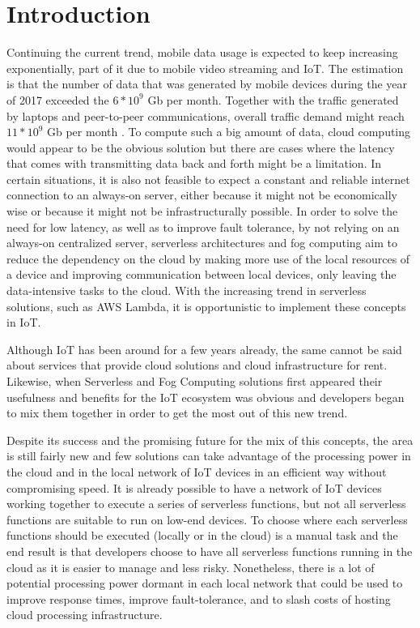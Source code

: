 \section{Introduction}
Continuing the current trend, mobile data usage is expected to keep increasing
exponentially, part of it due to mobile video streaming and
IoT. The estimation is that the number of data that was generated
by mobile devices during the year of 2017 exceeded the $\displaystyle 6 * 10^9$ Gb
per month. Together with the traffic generated by laptops and peer-to-peer
communications, overall traffic demand might reach $\displaystyle 11 * 10^9$ Gb per
month\cite{kn:Dehos2014} \cite{kn:Baresi2017}. To compute such a big amount of
data, cloud computing would appear to be the obvious solution but there are cases
where the latency that comes with transmitting data back and forth might be
a limitation. In certain situations, it is also not feasible to expect a constant and
reliable internet connection to an always-on server, either because it might not
be economically wise or because it might not be infrastructurally possible. In
order to solve the need for low latency, as well as to improve fault tolerance, by
not relying on an always-on centralized server, serverless architectures and fog
computing aim to reduce the dependency on the cloud by making more use of the
local resources of a device and improving communication between local devices,
only leaving the data-intensive tasks to the cloud\cite{kn:Baresi2017}. With the
increasing trend in serverless solutions, such as AWS Lambda, it is opportunistic
to implement these concepts in IoT.

Although IoT has been around for a few years already, the same cannot be said
about services that provide cloud solutions and cloud infrastructure for rent. 
Likewise, when Serverless and Fog Computing solutions first appeared their
usefulness and benefits for the IoT ecosystem was obvious and developers began to
mix them together in order to get the most out of this new trend.

Despite its success and the promising future for the mix of this concepts, the
area is still fairly new and few solutions can take advantage of the processing
power in the cloud and in the local network of IoT devices in an efficient way
without compromising speed. It is already possible to have a network of IoT
devices working together to execute a series of serverless functions, but not all
serverless functions are suitable to run on low-end devices. To choose where each
serverless functions should be executed (locally or in the cloud) is a manual task
and the end result is that developers choose to have all serverless functions
running in the cloud as it is easier to manage and less risky. Nonetheless, there
is a lot of potential processing power dormant in each local network that could
be used to improve response times, improve fault-tolerance,  and to slash costs of
hosting cloud processing infrastructure. 
